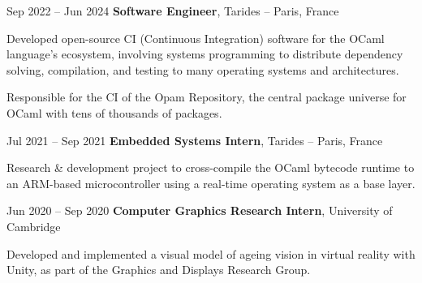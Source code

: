 \documentclass[10pt, letterpaper]{article}
\begin{document}
        \begin{twocolentry}{Sep 2022 -- Jun 2024}
            \textbf{Software Engineer}, Tarides -- Paris, France
        \end{twocolentry}
        \vspace{0.10 cm}
        \begin{onecolentry}
            \begin{highlights}
                \item Developed open-source CI (Continuous Integration) software for the OCaml language's ecosystem, involving systems programming to distribute dependency solving, compilation, and testing to many operating systems and architectures.
                \item Responsible for the CI of the Opam Repository, the central package universe for OCaml with tens of thousands of packages.
            \end{highlights}
        \end{onecolentry}

        \vspace{0.20 cm}

        \begin{twocolentry}{Jul 2021 -- Sep 2021}
            \textbf{Embedded Systems Intern}, Tarides -- Paris, France
        \end{twocolentry}
        \vspace{0.10 cm}
        \begin{onecolentry}
            \begin{highlights}
                \item Research \& development project to cross-compile the OCaml bytecode runtime to an ARM-based microcontroller using a real-time operating system as a base layer.
            \end{highlights}
        \end{onecolentry}

        \vspace{0.20 cm}

        \begin{twocolentry}{Jun 2020 -- Sep 2020}
            \textbf{Computer Graphics Research Intern}, University of Cambridge
        \end{twocolentry}
        \vspace{0.10 cm}
        \begin{onecolentry}
            \begin{highlights}
                \item Developed and implemented a visual model of ageing vision in virtual reality with Unity, as part of the Graphics and Displays Research Group.
            \end{highlights}
        \end{onecolentry}
\end{document}
